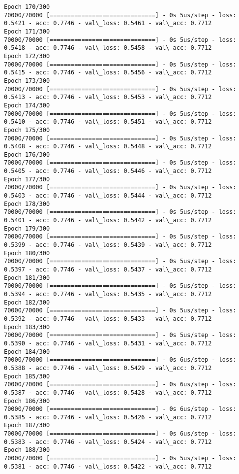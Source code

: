\documentclass[11pt]{article}
\begin{document}
\begin{Verbatim}[commandchars=\\\{\}]
Epoch 170/300
70000/70000 [==============================] - 0s 5us/step - loss: 0.5421 - acc: 0.7746 - val\_loss: 0.5461 - val\_acc: 0.7712
Epoch 171/300
70000/70000 [==============================] - 0s 5us/step - loss: 0.5418 - acc: 0.7746 - val\_loss: 0.5458 - val\_acc: 0.7712
Epoch 172/300
70000/70000 [==============================] - 0s 5us/step - loss: 0.5415 - acc: 0.7746 - val\_loss: 0.5456 - val\_acc: 0.7712
Epoch 173/300
70000/70000 [==============================] - 0s 5us/step - loss: 0.5413 - acc: 0.7746 - val\_loss: 0.5453 - val\_acc: 0.7712
Epoch 174/300
70000/70000 [==============================] - 0s 5us/step - loss: 0.5410 - acc: 0.7746 - val\_loss: 0.5451 - val\_acc: 0.7712
Epoch 175/300
70000/70000 [==============================] - 0s 5us/step - loss: 0.5408 - acc: 0.7746 - val\_loss: 0.5448 - val\_acc: 0.7712
Epoch 176/300
70000/70000 [==============================] - 0s 5us/step - loss: 0.5405 - acc: 0.7746 - val\_loss: 0.5446 - val\_acc: 0.7712
Epoch 177/300
70000/70000 [==============================] - 0s 5us/step - loss: 0.5403 - acc: 0.7746 - val\_loss: 0.5444 - val\_acc: 0.7712
Epoch 178/300
70000/70000 [==============================] - 0s 5us/step - loss: 0.5401 - acc: 0.7746 - val\_loss: 0.5442 - val\_acc: 0.7712
Epoch 179/300
70000/70000 [==============================] - 0s 5us/step - loss: 0.5399 - acc: 0.7746 - val\_loss: 0.5439 - val\_acc: 0.7712
Epoch 180/300
70000/70000 [==============================] - 0s 5us/step - loss: 0.5397 - acc: 0.7746 - val\_loss: 0.5437 - val\_acc: 0.7712
Epoch 181/300
70000/70000 [==============================] - 0s 5us/step - loss: 0.5394 - acc: 0.7746 - val\_loss: 0.5435 - val\_acc: 0.7712
Epoch 182/300
70000/70000 [==============================] - 0s 5us/step - loss: 0.5392 - acc: 0.7746 - val\_loss: 0.5433 - val\_acc: 0.7712
Epoch 183/300
70000/70000 [==============================] - 0s 5us/step - loss: 0.5390 - acc: 0.7746 - val\_loss: 0.5431 - val\_acc: 0.7712
Epoch 184/300
70000/70000 [==============================] - 0s 6us/step - loss: 0.5388 - acc: 0.7746 - val\_loss: 0.5429 - val\_acc: 0.7712
Epoch 185/300
70000/70000 [==============================] - 0s 6us/step - loss: 0.5387 - acc: 0.7746 - val\_loss: 0.5428 - val\_acc: 0.7712
Epoch 186/300
70000/70000 [==============================] - 0s 6us/step - loss: 0.5385 - acc: 0.7746 - val\_loss: 0.5426 - val\_acc: 0.7712
Epoch 187/300
70000/70000 [==============================] - 0s 6us/step - loss: 0.5383 - acc: 0.7746 - val\_loss: 0.5424 - val\_acc: 0.7712
Epoch 188/300
70000/70000 [==============================] - 0s 5us/step - loss: 0.5381 - acc: 0.7746 - val\_loss: 0.5422 - val\_acc: 0.7712

\end{Verbatim}
\end{document}
